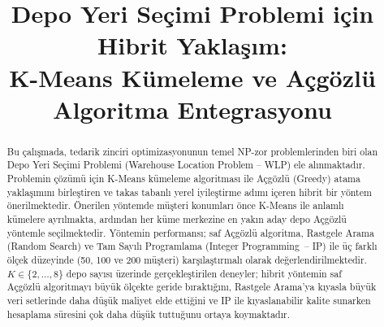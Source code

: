 \documentclass[conference]{IEEEtran}
\begin{document}
\title{Depo Yeri Se\c{c}imi Problemi i\c{c}in Hibrit Yakla\c{s}{\i}m:\\
K-Means K\"{u}meleme ve A\c{c}g\"{o}zl\"{u} Algoritma Entegrasyonu}

\author{
\and
{}
}

\maketitle

\begin{abstract}
Bu \c{c}al{\i}\c{s}mada, tedarik zinciri optimizasyonunun temel NP-zor
problemlerinden biri olan Depo Yeri Se\c{c}imi Problemi (Warehouse Location
Problem -- WLP) ele al{\i}nmaktad{\i}r.
Problemin \c{c}\"{o}z\"{u}m\"{u} i\c{c}in K-Means k\"{u}meleme algoritmas{\i}
ile A\c{c}g\"{o}zl\"{u} (Greedy) atama yakla\c{s}{\i}m{\i}n{\i} birle\c{s}tiren
ve takas tabanl{\i} yerel iyile\c{s}tirme ad{\i}m{\i} i\c{c}eren hibrit bir
y\"{o}ntem \"{o}nerilmektedir.
\"{O}nerilen y\"{o}ntemde m\"{u}\c{s}teri konumlar{\i} \"{o}nce K-Means ile
anlaml{\i} k\"{u}melere ayr{\i}lmakta, ard{\i}ndan her k\"{u}me merkezine en
yak{\i}n aday depo A\c{c}g\"{o}zl\"{u} y\"{o}ntemle se\c{c}ilmektedir.
Y\"{o}ntemin performans{\i}; saf A\c{c}g\"{o}zl\"{u} algoritma, Rastgele
Arama (Random Search) ve Tam Say{\i}l{\i} Programlama (Integer Programming~--
IP) ile \"{u}\c{c} farkl{\i} \"{o}l\c{c}ek d\"{u}zeyinde (50, 100 ve 200
m\"{u}\c{s}teri) kar\c{s}{\i}la\c{s}t{\i}rmal{\i} olarak
de\u{g}erlendirilmektedir.
$K \in \{2,\ldots,8\}$ depo say{\i}s{\i} \"{u}zerinde ger\c{c}ekle\c{s}tirilen
deneyler; hibrit y\"{o}ntemin saf A\c{c}g\"{o}zl\"{u} algoritmay{\i}
b\"{u}y\"{u}k \"{o}l\c{c}ekte geride b{\i}rakt{\i}\u{g}{\i}n{\i},
Rastgele Arama'ya k{\i}yasla b\"{u}y\"{u}k veri setlerinde daha d\"{u}\c{s}\"{u}k
maliyet elde etti\u{g}ini ve IP ile k{\i}yaslanabilir kalite sunarken
hesaplama s\"{u}resini \c{c}ok daha d\"{u}\c{s}\"{u}k tuttu\u{g}unu
ortaya koymaktad{\i}r.
\end{abstract}
\end{document}
